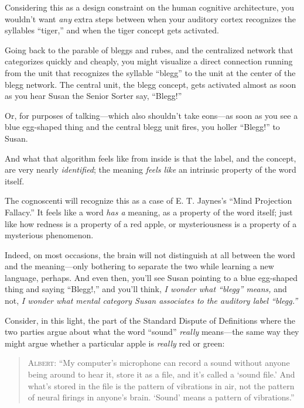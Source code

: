 { Considering this as a design constraint on the human cognitive
architecture, you wouldn't want \textit{any} extra
steps between when your auditory cortex recognizes the syllables
``tiger,'' and when the tiger
concept gets activated.


 Going back to the parable of bleggs and rubes, and the centralized
network that categorizes quickly and cheaply, you might visualize a
direct connection running from the unit that recognizes the syllable
``blegg'' to the unit at the center
of the blegg network. The central unit, the blegg concept, gets
activated almost as soon as you hear Susan the Senior Sorter say,
``Blegg!''


 Or, for purposes of talking---which also shouldn't
take eons---as soon as you see a blue egg-shaped thing and the central
blegg unit fires, you holler
``Blegg!'' to Susan.


 And what that algorithm feels like from inside is that the label,
and the concept, are very nearly \textit{identified}; the meaning
\textit{feels like} an intrinsic property of the word itself.


 The cognoscenti will recognize this as a case of E. T.
Jaynes's ``Mind Projection
Fallacy.'' It feels like a word \textit{has a}
meaning, as a property of the word itself; just like how redness is a
property of a red apple, or mysteriousness is a property of a
mysterious phenomenon.

{
 Indeed, on most occasions, the brain will not distinguish at all
between the word and the meaning---only bothering to separate the two
while learning a new language, perhaps. And even then,
you'll see Susan pointing to a blue egg-shaped thing
and saying ``Blegg!,'' and
you'll think, \textit{I wonder what
``blegg'' means,} and not, \textit{I
wonder what mental category Susan associates to the auditory label
``blegg.''}}


 Consider, in this light, the part of the Standard Dispute of
Definitions where the two parties argue about what the word
``sound'' \textit{really}
means---the same way they might argue whether a particular apple is
\textit{really} red or green:

\begin{quotation}

 \textsc{Albert}: ``My computer's
microphone can record a sound without anyone being around to hear it,
store it as a file, and it's called a
`sound file.' And what's
stored in the file is the pattern of vibrations in air, not the pattern
of neural firings in anyone's brain.
`Sound' means a pattern of
vibrations.''


\end{quotation}}
